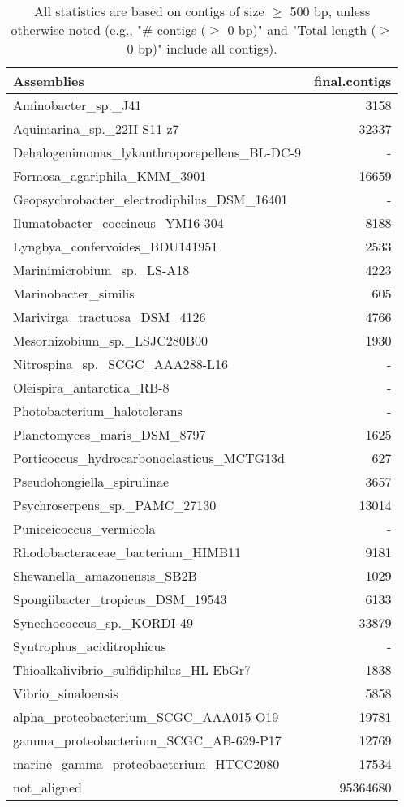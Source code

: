 \documentclass[12pt,a4paper]{article}
\begin{document}
\begin{table}[ht]
\begin{center}
\caption{All statistics are based on contigs of size $\geq$ 500 bp, unless otherwise noted (e.g., "\# contigs ($\geq$ 0 bp)" and "Total length ($\geq$ 0 bp)" include all contigs).}
\begin{tabular}{|l*{1}{|r}|}
\hline
Assemblies & final.contigs \\ \hline
Aminobacter\_sp.\_J41 & 3158 \\ \hline
Aquimarina\_sp.\_22II-S11-z7 & 32337 \\ \hline
Dehalogenimonas\_lykanthroporepellens\_BL-DC-9 & - \\ \hline
Formosa\_agariphila\_KMM\_3901 & 16659 \\ \hline
Geopsychrobacter\_electrodiphilus\_DSM\_16401 & - \\ \hline
Ilumatobacter\_coccineus\_YM16-304 & 8188 \\ \hline
Lyngbya\_confervoides\_BDU141951 & 2533 \\ \hline
Marinimicrobium\_sp.\_LS-A18 & 4223 \\ \hline
Marinobacter\_similis & 605 \\ \hline
Marivirga\_tractuosa\_DSM\_4126 & 4766 \\ \hline
Mesorhizobium\_sp.\_LSJC280B00 & 1930 \\ \hline
Nitrospina\_sp.\_SCGC\_AAA288-L16 & - \\ \hline
Oleispira\_antarctica\_RB-8 & - \\ \hline
Photobacterium\_halotolerans & - \\ \hline
Planctomyces\_maris\_DSM\_8797 & 1625 \\ \hline
Porticoccus\_hydrocarbonoclasticus\_MCTG13d & 627 \\ \hline
Pseudohongiella\_spirulinae & 3657 \\ \hline
Psychroserpens\_sp.\_PAMC\_27130 & 13014 \\ \hline
Puniceicoccus\_vermicola & - \\ \hline
Rhodobacteraceae\_bacterium\_HIMB11 & 9181 \\ \hline
Shewanella\_amazonensis\_SB2B & 1029 \\ \hline
Spongiibacter\_tropicus\_DSM\_19543 & 6133 \\ \hline
Synechococcus\_sp.\_KORDI-49 & 33879 \\ \hline
Syntrophus\_aciditrophicus & - \\ \hline
Thioalkalivibrio\_sulfidiphilus\_HL-EbGr7 & 1838 \\ \hline
Vibrio\_sinaloensis & 5858 \\ \hline
alpha\_proteobacterium\_SCGC\_AAA015-O19 & 19781 \\ \hline
gamma\_proteobacterium\_SCGC\_AB-629-P17 & 12769 \\ \hline
marine\_gamma\_proteobacterium\_HTCC2080 & 17534 \\ \hline
not\_aligned & 95364680 \\ \hline
\end{tabular}
\end{center}
\end{table}
\end{document}
